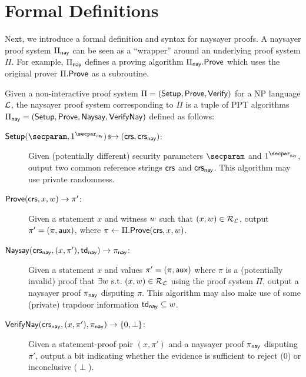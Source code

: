 \section{Formal Definitions}\label{sec:naysayer_def}

Next, we introduce a formal definition and syntax for naysayer proofs. A naysayer proof system $\Pi_{\mathsf{nay}}$ can be seen as a ``wrapper'' around an underlying proof system $\Pi$. For example, $\Pi_{\sf nay}$ defines a proving algorithm $\Pi_{\mathsf{nay}}.\mathsf{Prove}$ which uses the original prover $\Pi.\mathsf{Prove}$ as a subroutine.

\begin{definition}\label{def:naysayer_proof}
Given a non-interactive proof system $\Pi = (\mathsf{Setup}, \mathsf{Prove}, \mathsf{Verify})$ for a NP language $\mathcal{L}$, the naysayer proof system corresponding to $\Pi$ is a tuple of PPT algorithms $\Pi_{\mathsf{nay}} = (\mathsf{Setup}, \mathsf{Prove},\allowbreak \mathsf{Naysay}, {\mathsf{Verify}}\mathsf{Nay})$ defined as follows:
    \begin{description}
        \item[$\setup(\secparam, \naysecparam) \randout (\crs,\crs_{\nay})$:] Given (potentially different) security parameters $\secparam$ and $\naysecparam$, output two common reference strings $\mathsf{crs}$ and $\mathsf{crs}_{\mathsf{nay}}$. This algorithm may use private randomness.
        \item[$\mathsf{Prove}(\mathsf{crs}, x, w) \to \pi'$:] Given a statement $x$ and witness $w$ such that $(x,\allowbreak w) \in \mathcal{R}_{\mathcal{L}}$, 
        output $\pi' = (\pi, \mathsf{aux})$, where $\pi \gets \Pi.\mathsf{Prove}(\mathsf{crs}, x, w)$.
        \item[$\mathsf{Naysay}(\mathsf{crs}_{\mathsf{nay}}, (x,\pi'), \mathsf{td}_{\mathsf{nay}}) \rightarrow \pi_{\mathsf{nay}}$:] Given a statement $x$ and values $\pi' = (\pi,\allowbreak \mathsf{aux})$ where $\pi$ is a (potentially invalid) proof that $\exists w \mathrm{~s.t.~} (x,w) \in \mathcal{R}_{\mathcal{L}}$ using the proof system $\Pi$, output a naysayer proof $\pi_{\mathsf{nay}}$ disputing $\pi$. This algorithm may also make use of some (private) trapdoor information $\mathsf{td}_{\mathsf{nay}} \subseteq w$.
        \item[${\mathsf{Verify}}\mathsf{Nay}(\mathsf{crs}_{\mathsf{nay}}, (x,\pi'), \pi_{\mathsf{nay}}) \rightarrow \{0, \perp\}$:] Given a statement-proof pair $(x,\allowbreak \pi')$ and a naysayer proof $\pi_{\mathsf{nay}}$ disputing $\pi'$, output a bit indicating whether the evidence is sufficient to reject (0) or inconclusive ($\perp$).
    \end{description}
\end{definition}

